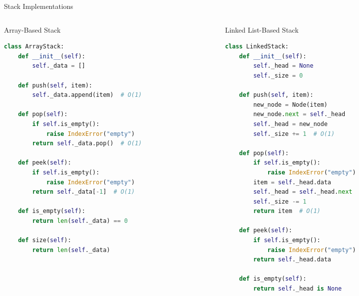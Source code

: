 \documentclass[aspectratio=169,xcolor=dvipsnames]{beamer}
\begin{document}
\begin{frame}[fragile]{Stack Implementations}
  \begin{columns}
    \begin{column}{0.48\textwidth}
      \begin{exampleblock}{Array-Based Stack}
        \begin{lstlisting}[language=Python,basicstyle=\tiny\ttfamily]
class ArrayStack:
    def __init__(self):
        self._data = []

    def push(self, item):
        self._data.append(item)  # O(1)

    def pop(self):
        if self.is_empty():
            raise IndexError("empty")
        return self._data.pop()  # O(1)

    def peek(self):
        if self.is_empty():
            raise IndexError("empty")
        return self._data[-1]  # O(1)

    def is_empty(self):
        return len(self._data) == 0

    def size(self):
        return len(self._data)
        \end{lstlisting}
      \end{exampleblock}
    \end{column}
    \begin{column}{0.48\textwidth}
      \begin{exampleblock}{Linked List-Based Stack}
        \begin{lstlisting}[language=Python,basicstyle=\tiny\ttfamily]
class LinkedStack:
    def __init__(self):
        self._head = None
        self._size = 0

    def push(self, item):
        new_node = Node(item)
        new_node.next = self._head
        self._head = new_node
        self._size += 1  # O(1)

    def pop(self):
        if self.is_empty():
            raise IndexError("empty")
        item = self._head.data
        self._head = self._head.next
        self._size -= 1
        return item  # O(1)

    def peek(self):
        if self.is_empty():
            raise IndexError("empty")
        return self._head.data

    def is_empty(self):
        return self._head is None
        \end{lstlisting}
      \end{exampleblock}
    \end{column}
  \end{columns}
\end{frame}
\end{document}
